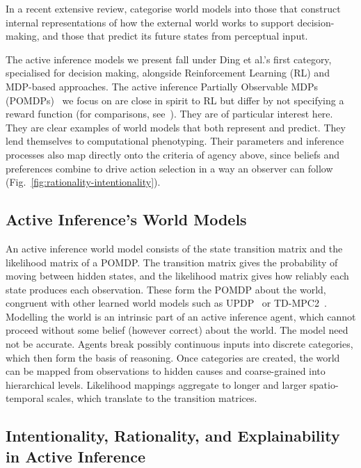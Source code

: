 \documentclass[pdflatex,sn-apa]{sn-jnl}%
\theoremstyle{definition}
\begin{document}
In a recent extensive review, \citet{dingUnderstandingWorldPredicting2024} categorise world models into those that construct internal representations of how the external world works to support decision-making, and those that predict its future states from perceptual input.

The active inference models we present fall under Ding et al.'s first category, specialised for decision making, alongside Reinforcement Learning (RL) and MDP-based approaches. The active inference Partially Observable MDPs (POMDPs)~\citep{dacostaActiveInferenceDiscrete2020} we focus on are close in spirit to RL but differ by not specifying a reward function (for comparisons, see~\citep{tschantzREINFORCEMENTLEARNINGACTIVE2020,fristonReinforcementLearningActive2009a,dacostaRewardMaximizationDiscrete2023}). They are of particular interest here. They are clear examples of world models that both represent and predict. They lend themselves to computational phenotyping. Their parameters and inference processes also map directly onto the criteria of agency above, since beliefs and preferences combine to drive action selection in a way an observer can follow (Fig.~\ref{fig:rationality-intentionality}).

\subsection{Active Inference's World Models}

An active inference world model consists of the state transition matrix and the likelihood matrix of a POMDP. The transition matrix gives the probability of moving between hidden states, and the likelihood matrix gives how reliably each state produces each observation. These form the POMDP about the world, congruent with other learned world models such as UPDP~\citep{duLearningUniversalPolicies2023} or TD-MPC2~\citep{hansenTDMPC2ScalableRobust2024}. Modelling the world is an intrinsic part of an active inference agent, which cannot proceed without some belief (however correct) about the world. The model need not be accurate. Agents break possibly continuous inputs into discrete categories, which then form the basis of reasoning. Once categories are created, the world can be mapped from observations to hidden causes and coarse-grained into hierarchical levels. Likelihood mappings aggregate to longer and larger spatio-temporal scales, which translate to the transition matrices.

\subsection{Intentionality, Rationality, and Explainability in Active Inference}
\end{document}
